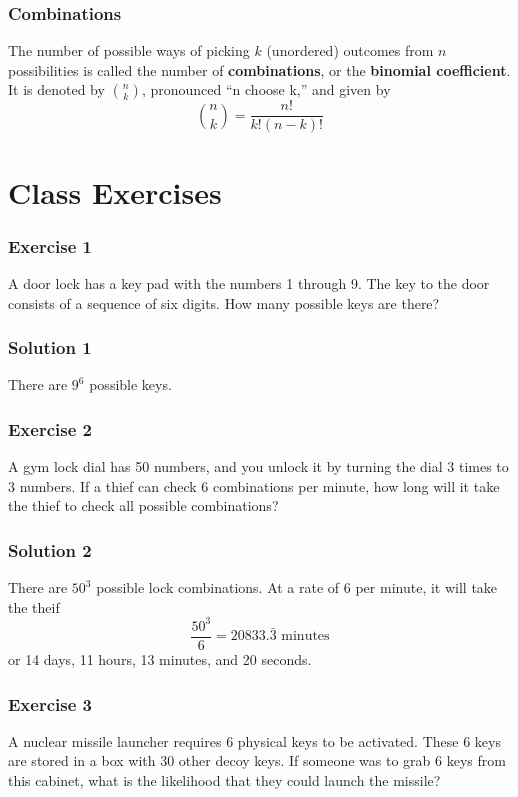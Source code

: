 \documentclass{beamer}
\newcommand{\<}{\langle}
\renewcommand{\>}{\rangle}
\begin{document}
\begin{frame}
\frametitle{Combinations}

The {\color{red}number of possible ways of picking $k$ (unordered) outcomes from $n$ possibilities} is called the number of \textbf{combinations}, or the \textbf{binomial coefficient}. It is denoted by $n\choose k$, pronounced ``n choose k,'' and given by 
\[
{n \choose k} = \frac{n!}{k!(n-k)!}
\]
\end{frame}


\section{Class Exercises}


\begin{frame}
\frametitle{Exercise 1}

A door lock has a key pad with the numbers 1 through 9. The key to the door consists of a sequence of six digits. How many possible keys are there?
\end{frame}

\begin{frame}
\frametitle{Solution 1}

There are $9^6$ possible keys.
\end{frame}

\begin{frame}
\frametitle{Exercise 2}

A gym lock dial has 50 numbers, and you unlock it by turning the dial 3 times to 3 numbers. If a thief can check 6 combinations per minute, how long will it take the thief to check all possible combinations?
\end{frame}

\begin{frame}
\frametitle{Solution 2}

There are $50^3$ possible lock combinations. At a rate of 6 per minute, it will take the theif 
\[
\frac{50^3}{6} = 20833.\bar{3} \text{ minutes}
\]
or 14 days, 11 hours, 13 minutes, and 20 seconds.
\end{frame}

\begin{frame}
\frametitle{Exercise 3}

A nuclear missile launcher requires 6 physical keys to be activated. These 6 keys are stored in a box with 30 other decoy keys. If someone was to grab 6 keys from this cabinet, what is the likelihood that they could launch the missile?
\end{frame}
\end{document}
